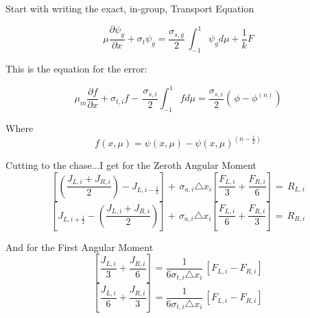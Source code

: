 
\begin{center}
\section*{}
\label{sec:LC_DSA}
\end{center}

\thispagestyle{empty}

\noindent
	\indent Start with writing the exact, in-group, Transport Equation
	
	\begin{equation}
		\mu\frac{\partial{\psi_g}}{\partial{x}}+\sigma_t{\psi_g}=\frac{\sigma_{s,g}}{2}
		\, \int_{-1}^{1}{\psi_g}d{\mu}+\frac{1}{k}F
	\end{equation}
	
\noindent
	\indent This is the equation for the error:

	\begin{equation}
		\mu_{m} \frac{\partial{f}}{\partial{x}}+\sigma_{t,i}{f}-
		\, \frac{\sigma_{s,i}}{2}\int_{-1}^{1}{f}{d\mu}=\frac{\sigma_{s,i}}{2}\left(
		\, \phi-\phi^{(n)}\right)
	\end{equation}

\noindent
	\indent Where 
	\begin{equation}
			f\left({x},{\mu}\right)=\psi\left({x},{\mu}\right)-\psi\left({x},{\mu}\right)^{(n-\frac{1}{2})}
	\end{equation}

\noindent
	\indent Cutting to the chase...I get for the Zeroth Angular Moment
 	\begin{equation}
			\left[\left(\frac{J_{L,i}+J_{R,i}}{2}\right)-J_{L,i-\frac{1}{2}}\right]+
			\, \sigma_{a,i}\triangle{x_{i}}\left[\frac{F_{L,i}}{3}+\frac{F_{R,i}}{6}\right]=
			\, R_{L,i}
	\end{equation}
	\begin{equation}
			\left[J_{L,i+\frac{1}{2}}-\left(\frac{J_{L,i}+J_{R,i}}{2}\right)\right]+
			\, \sigma_{a,i}\triangle{x_{i}}\left[\frac{F_{L,i}}{6}+\frac{F_{R,i}}{3}\right]=
			\, R_{R,i}
	\end{equation}

\noindent
	\indent And for the First Angular Moment
	\begin{equation}
		\left[\frac{J_{L,i}}{3}+\frac{J_{R,i}}{6}\right]=\frac{1}{6\sigma_{t,i}\triangle{x_{i}}}
		\, \left[F_{L,i}-F_{R,i}\right]
	\end{equation}
	\begin{equation}
		\left[\frac{J_{L,i}}{6}+\frac{J_{R,i}}{3}\right]=\frac{1}{6\sigma_{t,i}\triangle{x_{i}}}
		\, \left[F_{L,i}-F_{R,i}\right]
	\end{equation}


